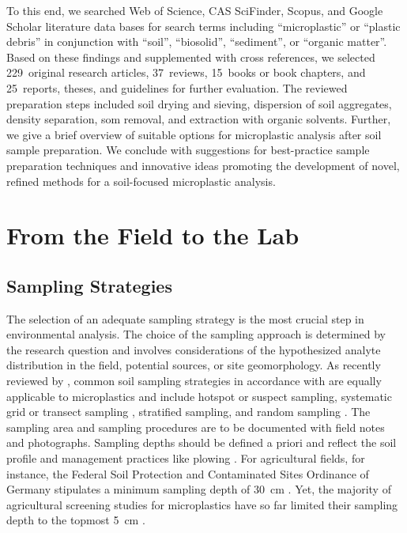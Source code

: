 To this end, we searched Web of Science, CAS SciFinder, Scopus, and Google Scholar literature data bases for search terms including ``microplastic'' or ``plastic debris'' in conjunction with ``soil'', ``biosolid'', ``sediment'', or ``organic matter''. Based on these findings and supplemented with cross references, we selected 229~original research articles, 37~reviews, 15~books or book chapters, and 25~reports, theses, and guidelines for further evaluation.
The reviewed preparation steps included soil drying and sieving, dispersion of soil aggregates, density separation, \ac{som} removal, and extraction with organic solvents.
Further, we give a brief overview of suitable options for microplastic analysis after soil sample preparation. We conclude with suggestions for best-practice sample preparation techniques and innovative ideas promoting the development of novel, refined methods for a soil-focused microplastic analysis.

\section{From the Field to the Lab}
\label{sec:analytical-techniques:field-to-lab}

\subsection{Sampling Strategies}
\label{sec:analytical-techniques:sampling}

The selection of an adequate sampling strategy is the most crucial step in environmental analysis. The choice of the sampling approach is determined by the research question and involves considerations of the hypothesized analyte distribution in the field, potential sources, or site geomorphology. As recently reviewed by \citet{MollerFinding2020}, common soil sampling strategies in accordance with \citet{ISO18400-102Soil2017} are equally applicable to microplastics and include hotspot or suspect sampling, systematic grid or transect sampling \citep[as conducted by][]{PiehlIdentification2018}, stratified sampling, and random sampling \citep{CorradiniEvidence2019}. The sampling area and sampling procedures are to be documented with field notes and photographs.
Sampling depths should be defined a priori and reflect the soil profile and management practices like plowing \citep{SponagelBodenkundliche2005,ISO18400-102Soil2017}. For agricultural fields, for instance, the Federal Soil Protection and Contaminated Sites Ordinance of Germany stipulates a minimum sampling depth of \SI{30}{\centi\meter} \citep{BBodSchVFederal1999}. Yet, the majority of agricultural screening studies for microplastics have so far limited their sampling depth to the topmost \SI{5}{\centi\meter} \citep{LiuMicroplastic2018,PiehlIdentification2018}.

